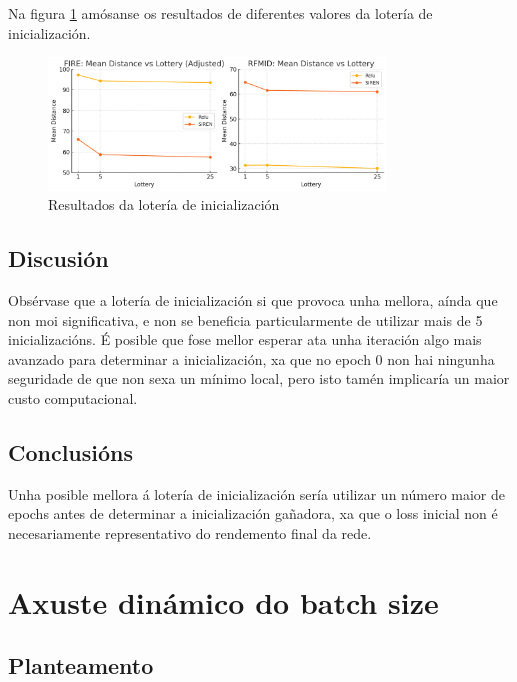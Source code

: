 Na figura \ref{fig:lottery} amósanse os resultados de diferentes valores da lotería de inicialización.


\begin{figure}[ht]
    \centering
    \includegraphics[width=0.8\textwidth]{imaxes/lottery/lotery.png}
    \caption{Resultados da lotería de inicialización}
    \label{fig:lottery}
\end{figure}


\subsection{Discusión}
\label{subsec:Discusion-initialization}

Obsérvase que a lotería de inicialización si que provoca unha mellora, aínda que non moi significativa, e non se beneficia particularmente de utilizar mais de 5 inicializacións.
É posible que fose mellor esperar ata unha iteración algo mais avanzado para determinar a inicialización, xa que no epoch 0 non hai ningunha seguridade de que non sexa un mínimo local, pero isto tamén implicaría un maior custo computacional.

\subsection{Conclusións}
\label{subsec:Conclusions-initialization}

Unha posible mellora á lotería de inicialización sería utilizar un número maior de epochs antes de determinar a inicialización gañadora, xa que o loss inicial non é necesariamente representativo do rendemento final da rede.

\section{Axuste dinámico do batch size}
\label{sec:Dynamic batch size}

\subsection{Planteamento}
\label{subsec:Planteamento-phases}


